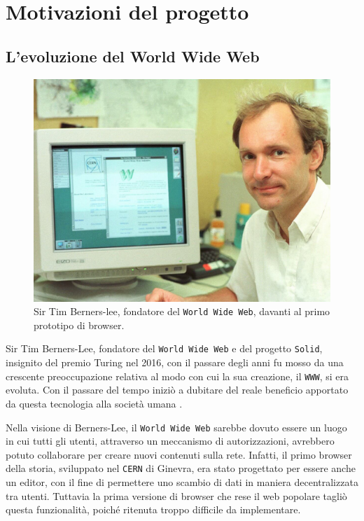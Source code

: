 \chapter{Motivazioni del progetto}

\medskip

\section{L'evoluzione del World Wide Web}

\medskip

\begin{figure}[ht]
	\centering
	\includegraphics[width=0.87
	\textwidth,  keepaspectratio]{fig/Berners-Lee}
	\caption{Sir Tim Berners-lee, fondatore del {\tt World Wide Web}, davanti al primo prototipo di browser.}
	\label{fig:bernersLee}
\end{figure}

\medskip 

Sir Tim Berners-Lee, fondatore del {\tt World Wide Web} e del progetto {\tt Solid}, insignito del premio Turing nel 2016, con il passare degli anni fu mosso da una crescente preoccupazione relativa al modo con cui la sua creazione, il {\tt WWW}, si era evoluta. Con il passare del tempo iniziò a dubitare del reale beneficio apportato da questa tecnologia alla società umana \cite{sciencefocus}.

\bigskip

Nella visione di Berners-Lee, il {\tt World Wide Web} sarebbe dovuto essere un luogo in cui tutti gli utenti, attraverso un meccanismo di autorizzazioni, avrebbero potuto collaborare per creare nuovi contenuti sulla rete. Infatti, il primo browser della storia, sviluppato nel {\tt CERN} di Ginevra, era stato progettato per essere anche un editor, con il fine di permettere uno scambio di dati in maniera decentralizzata tra utenti. Tuttavia la prima versione di browser che rese il web popolare tagliò questa funzionalità, poiché ritenuta troppo difficile da implementare.  

